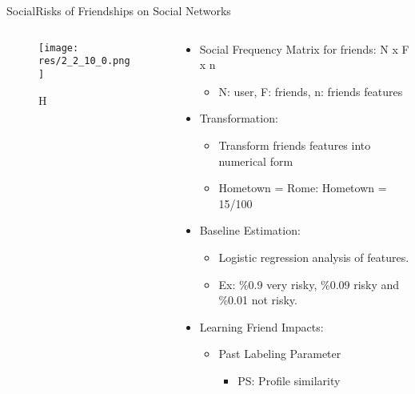 \begin{frame}{Social}{Risks of Friendships on Social Networks \cite{akcora_risks_2012}}

	\begin{columns}
		\begin{column}{0.4\textwidth}
			\begin{center}
			
				\begin{figure}
					\texttt{[image: res/2\_2\_10\_0.png]}
					\caption{\label{fig:2_2_10_0}H}
				\end{figure}
				
			\end{center}
		\end{column}
		
		\begin{column}{0.6\textwidth}
		
			\begin{itemize}
			
				\item Social Frequency Matrix for friends: N x F x n
					\begin{itemize}
						\item N: user, F: friends, n: friends features
					\end{itemize}
					

				\item Transformation:
					\begin{itemize}
						\item Transform friends features into numerical form
						\item Hometown = Rome: Hometown = 15/100 
					\end{itemize}
					
				\item Baseline Estimation:
					\begin{itemize}
						\item Logistic regression analysis of features.
						\item Ex: \%0.9 very risky, \%0.09 risky and \%0.01 not risky. 
					
					\end{itemize}
				\item Learning Friend Impacts: 
					\begin{itemize}
						\item Past Labeling Parameter
							\begin{itemize}
								\item PS: Profile similarity
							\end{itemize}
							

\end{itemize}
\end{itemize}
\end{column}
\end{columns}
\end{frame}
